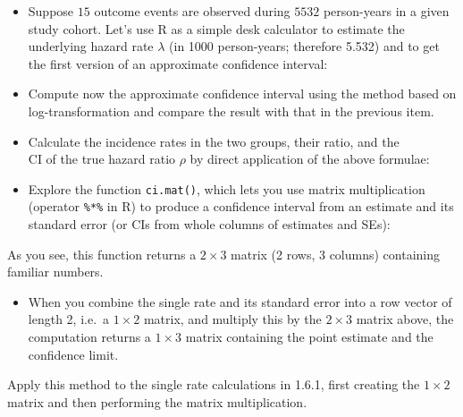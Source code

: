 \documentclass[
]{book}
\providecommand{\tightlist}{%
  \setlength{\itemsep}{0pt}\setlength{\parskip}{0pt}}
\begin{document}
\begin{itemize}
\item
  Suppose \(15\) outcome events are observed during \(5532\) person-years in a given study cohort.
  Let's use R as a simple desk calculator to estimate the underlying hazard rate \(\lambda\) (in 1000
  person-years; therefore 5.532) and to get the first version of an approximate confidence
  interval:
\item
  Compute now the approximate confidence interval using the method
  based on log-transformation and compare the result with that in the previous item.
\item
  Calculate the incidence rates in the two groups, their ratio, and the\\
  CI of the true hazard ratio \(\rho\) by direct application of the above formulae:
\item
  Explore the function \texttt{ci.mat()}, which lets you use
  matrix multiplication (operator \texttt{\textquotesingle{}\%*\%\textquotesingle{}}
  in R) to produce a confidence interval from an estimate and its
  standard error (or CIs from whole columns of estimates and SEs):
\end{itemize}

As you see, this function returns a \(2\times 3\) matrix (2 rows, 3 columns) containing familiar numbers.

\begin{itemize}
\tightlist
\item
  When you combine the single rate and its standard error into
  a row vector of length 2, i.e.~a \(1\times 2\) matrix, and multiply this
  by the \(2\times 3\) matrix above, the computation returns
  a \(1\times 3\) matrix containing the point estimate and the
  confidence limit.
\end{itemize}

Apply this method to the single rate calculations in 1.6.1, first creating the \(1 \times 2\) matrix and then performing the matrix multiplication.
\end{document}
